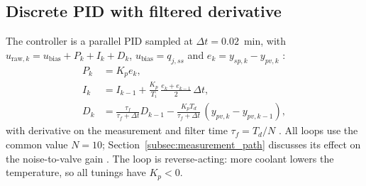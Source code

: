 \subsection{Discrete PID with filtered derivative}
The controller is a parallel PID sampled at $\Delta t = 0.02$~min, with $u_{\text{raw},k} = u_{\text{bias}} + P_k + I_k + D_k$, $u_{\text{bias}} = q_{j,ss}$ and $e_k = y_{sp,k} - y_{pv,k}$ \cite{astrom2006pid, seborg2010process}:
\begin{align}
    P_k &= K_p e_k, \label{eq:proportional_term} \\
    I_k &= I_{k-1} + \frac{K_p}{T_i}\,\frac{e_k + e_{k-1}}{2}\,\Delta t, \label{eq:integral_trapezoidal} \\
    D_k &= \frac{\tau_f}{\tau_f + \Delta t} D_{k-1} - \frac{K_p T_d}{\tau_f + \Delta t}\,(y_{pv,k} - y_{pv,k-1}), \label{eq:derivative_filtered}
\end{align}
with derivative on the measurement and filter time $\tau_f = T_d/N$ \cite{astrom1995pid, visioli2006practical}. All loops use the common value $N = 10$; Section~\ref{subsec:measurement_path} discusses its effect on the noise-to-valve gain \cite{segovia2013noise}. The loop is reverse-acting: more coolant lowers the temperature, so all tunings have $K_p < 0$.

